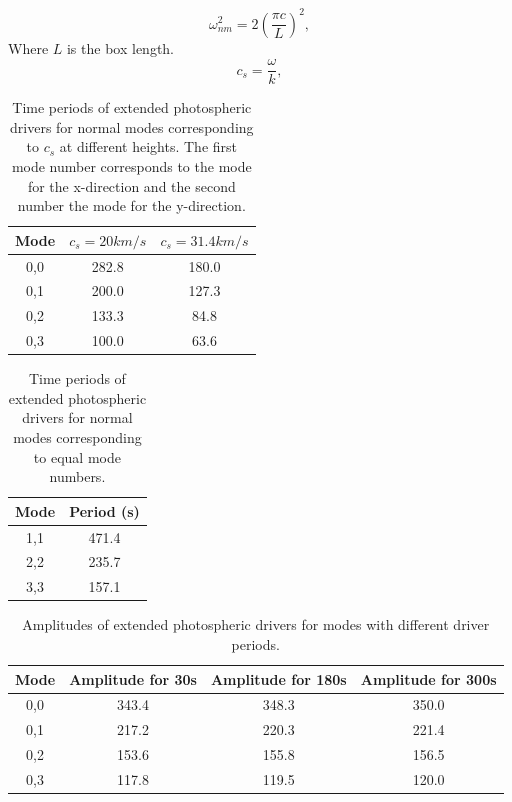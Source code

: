 \documentclass[authoryear,final,1p]{elsarticle}
\begin{document}
\begin{equation}\label{normmodedrvfreq}
\omega_{nm}^{2}= 2\left(   \frac{\pi c}{L} \right) ^{2},
\end{equation}
Where $L$ is the box length.
\begin{equation}\label{normmodecs}
c_s= \frac{\omega}{k},
\end{equation}

\begin{table}\label{simperiods}
\centering
\begin{tabular}{c c c }
\hline
Mode   &  $c_s=20km/s$ &  $c_s=31.4km/s$ \\
\hline
0,0 & 282.8 & 180.0 \\
\hline
0,1 & 200.0 & 127.3  \\
\hline
0,2 & 133.3 & 84.8  \\
\hline
0,3 & 100.0 & 63.6  \\
\hline
\end{tabular} 
\caption{Time periods of extended photospheric drivers for normal modes corresponding to $c_s$ at different heights. The first mode number corresponds to the mode for the x-direction and the second number the mode for the y-direction.}
\end{table}

\begin{table}\label{simcperiods}
\centering
\begin{tabular}{c c }
\hline
Mode   &  Period (s) \\
\hline
1,1 & 471.4  \\
\hline
2,2 & 235.7   \\
\hline
3,3 & 157.1   \\
\hline

\end{tabular} 
\caption{Time periods of extended photospheric drivers for normal modes corresponding to equal mode numbers.}
\end{table}









\begin{table}\label{simamps}
\centering
\begin{tabular}{c c c c }
\hline
Mode   &  Amplitude for 30s &  Amplitude for 180s &  Amplitude for 300s\\
\hline
0,0 & 343.4 & 348.3 & 350.0 \\
\hline
0,1 & 217.2 & 220.3 & 221.4 \\
\hline
0,2 & 153.6 & 155.8 & 156.5 \\
\hline
0,3 & 117.8 & 119.5 & 120.0 \\
\hline
\end{tabular} 
\caption{Amplitudes of extended photospheric drivers for modes with different driver periods.}
\end{table}
\end{document}

